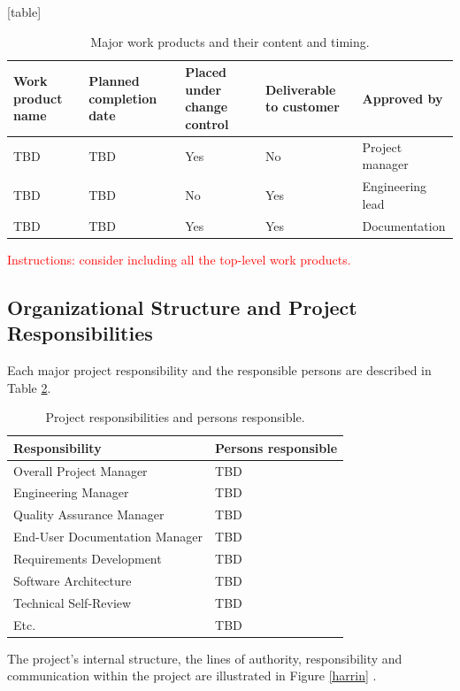 \documentclass{article}
\begin{document}
[table]
\begin{table}[h]
\centering
\caption{ Major work products and their content and timing.}
\label{tab:work_product_status}
\begin{tabular}{|p{2cm}|p{2cm}|p{2cm}|p{2cm}|p{2.2cm}|}
\hline
\textbf{Work product name} & \textbf{Planned completion date} & \textbf{Placed under change control} & \textbf{Deliverable to customer} & \textbf{Approved by} \\
\hline
TBD & TBD & Yes & No & Project manager  \\
\hline
 TBD & TBD & No & Yes & Engineering lead  \\
\hline
 TBD & TBD & Yes & Yes & Documentation  \\
\hline
\end{tabular}
\end{table}

\textcolor{red}{Instructions: consider including all the top-level work products.}

\subsection{Organizational Structure and Project Responsibilities}
Each major project responsibility and the responsible persons are described in
Table \ref{tab:project_responsibilities}.

\begin{table}[h]
\centering
\caption{Project responsibilities and persons responsible.}
\label{tab:project_responsibilities}
\begin{tabular}{|l|l|}
\hline
\textbf{Responsibility} & \textbf{Persons responsible} \\
\hline
Overall Project Manager & TBD \\
\hline
Engineering Manager & TBD \\
\hline
Quality Assurance Manager & TBD \\
\hline
End-User Documentation Manager & TBD \\
\hline
Requirements Development & TBD \\
\hline
Software Architecture & TBD \\
\hline
Technical Self-Review & TBD \\
\hline
Etc. & TBD \\
\hline
\end{tabular}
\end{table}



The project’s internal structure, the lines of authority, responsibility and
communication within the project are illustrated in Figure \ref{harrin} .
\end{document}
